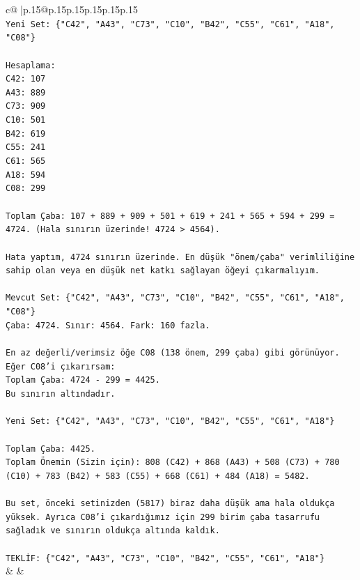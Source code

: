 \documentclass{article}
\begin{document}
{\begin{supertabular}{c@{$\;$}|p{.15\linewidth}@{}p{.15\linewidth}p{.15\linewidth}p{.15\linewidth}p{.15\linewidth}p{.15\linewidth}}
{{{\\ 
\texttt{Yeni Set: \{"C42", "A43", "C73", "C10", "B42", "C55", "C61", "A18", "C08"\}} \\
\\ 
\texttt{Hesaplama:} \\
\texttt{C42: 107} \\
\texttt{A43: 889} \\
\texttt{C73: 909} \\
\texttt{C10: 501} \\
\texttt{B42: 619} \\
\texttt{C55: 241} \\
\texttt{C61: 565} \\
\texttt{A18: 594} \\
\texttt{C08: 299} \\
\\ 
\texttt{Toplam Çaba: 107 + 889 + 909 + 501 + 619 + 241 + 565 + 594 + 299 = 4724. (Hala sınırın üzerinde! 4724 > 4564).} \\
\\ 
\texttt{Hata yaptım, 4724 sınırın üzerinde. En düşük "önem/çaba" verimliliğine sahip olan veya en düşük net katkı sağlayan öğeyi çıkarmalıyım.} \\
\\ 
\texttt{Mevcut Set: \{"C42", "A43", "C73", "C10", "B42", "C55", "C61", "A18", "C08"\}} \\
\texttt{Çaba: 4724. Sınır: 4564. Fark: 160 fazla.} \\
\\ 
\texttt{En az değerli/verimsiz öğe C08 (138 önem, 299 çaba) gibi görünüyor. Eğer C08'i çıkarırsam:} \\
\texttt{Toplam Çaba: 4724 {-} 299 = 4425.} \\
\texttt{Bu sınırın altındadır.} \\
\\ 
\texttt{Yeni Set: \{"C42", "A43", "C73", "C10", "B42", "C55", "C61", "A18"\}} \\
\\ 
\texttt{Toplam Çaba: 4425.} \\
\texttt{Toplam Önemin (Sizin için): 808 (C42) + 868 (A43) + 508 (C73) + 780 (C10) + 783 (B42) + 583 (C55) + 668 (C61) + 484 (A18) = 5482.} \\
\\ 
\texttt{Bu set, önceki setinizden (5817) biraz daha düşük ama hala oldukça yüksek. Ayrıca C08'i çıkardığımız için 299 birim çaba tasarrufu sağladık ve sınırın oldukça altında kaldık.} \\
\\ 
\texttt{TEKLİF: \{"C42", "A43", "C73", "C10", "B42", "C55", "C61", "A18"\}} \\
            }
        }
    }
    & & \\ \\


\end{supertabular}}
\end{document}
